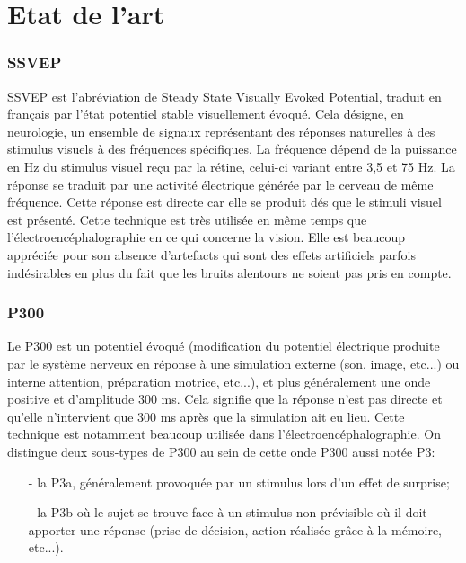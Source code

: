 \part{Etat de l'art} %
\label{prt:etat}
	\section{SSVEP} %
	SSVEP est l'abréviation de Steady State Visually Evoked Potential, traduit en français par l'état potentiel stable visuellement évoqué. Cela désigne, en neurologie, un ensemble de signaux représentant des réponses naturelles à des stimulus visuels à des fréquences spécifiques. La fréquence dépend de la puissance en Hz du stimulus visuel reçu par la rétine, celui-ci variant entre 3,5 et 75 Hz. La réponse se traduit par une activité électrique générée par le cerveau de même fréquence. Cette réponse est directe car elle se produit dés que le stimuli visuel est présenté.
		Cette technique est très utilisée en même temps que l'électroencéphalographie en ce qui concerne la vision. Elle est beaucoup appréciée pour son absence d'artefacts qui sont des effets artificiels parfois indésirables en plus du fait que les bruits alentours ne soient pas pris en compte.
	\label{sec:technique_ssvep}
	
	\section{P300} %
	Le P300 est un potentiel évoqué (modification du potentiel électrique produite par le système nerveux en réponse à une simulation externe (son, image, etc...) ou interne attention, préparation motrice, etc...), et plus généralement une onde positive et d'amplitude 300 ms. Cela signifie que la réponse n'est pas directe et qu'elle n'intervient que 300 ms après que la simulation ait eu lieu. Cette technique est notamment beaucoup utilisée dans l'électroencéphalographie.
			On distingue deux sous-types de P300 au sein de cette onde P300 aussi notée P3:
			\begin{itemize}
			\item[-] la P3a, généralement provoquée par un stimulus lors d'un effet de surprise;
			\item[-] la P3b où le sujet se trouve face à un stimulus non prévisible où il doit apporter une réponse (prise de décision, action réalisée grâce à la mémoire, etc...).
\end{itemize}			
	\label{sec:technique_p300}
